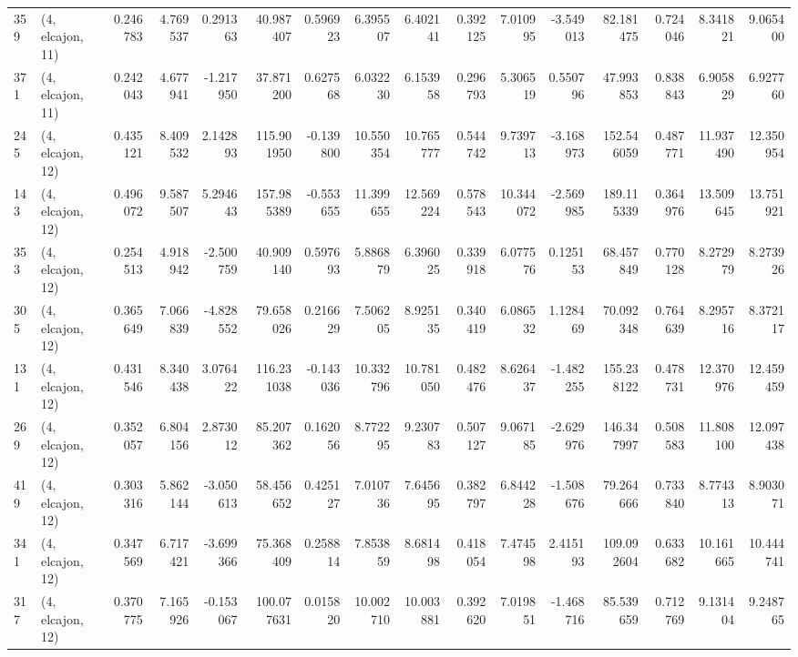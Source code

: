 \begin{tabular}{llrrrrrrrrrrrrrr}
359 &  (4, elcajon, 11) &   0.246783 &   4.769537 &   0.291363 &    40.987407 &   0.596923 &   6.395507 &   6.402141 &  0.392125 &   7.010995 &  -3.549013 &    82.181475 &   0.724046 &   8.341821 &   9.065400 \\
371 &  (4, elcajon, 11) &   0.242043 &   4.677941 &  -1.217950 &    37.871200 &   0.627568 &   6.032230 &   6.153958 &  0.296793 &   5.306519 &   0.550796 &    47.993853 &   0.838843 &   6.905829 &   6.927760 \\
245 &  (4, elcajon, 12) &   0.435121 &   8.409532 &   2.142893 &   115.901950 &  -0.139800 &  10.550354 &  10.765777 &  0.544742 &   9.739713 &  -3.168973 &   152.546059 &   0.487771 &  11.937490 &  12.350954 \\
143 &  (4, elcajon, 12) &   0.496072 &   9.587507 &   5.294643 &   157.985389 &  -0.553655 &  11.399655 &  12.569224 &  0.578543 &  10.344072 &  -2.569985 &   189.115339 &   0.364976 &  13.509645 &  13.751921 \\
353 &  (4, elcajon, 12) &   0.254513 &   4.918942 &  -2.500759 &    40.909140 &   0.597693 &   5.886879 &   6.396025 &  0.339918 &   6.077576 &   0.125153 &    68.457849 &   0.770128 &   8.272979 &   8.273926 \\
305 &  (4, elcajon, 12) &   0.365649 &   7.066839 &  -4.828552 &    79.658026 &   0.216629 &   7.506205 &   8.925135 &  0.340419 &   6.086532 &   1.128469 &    70.092348 &   0.764639 &   8.295716 &   8.372117 \\
131 &  (4, elcajon, 12) &   0.431546 &   8.340438 &   3.076422 &   116.231038 &  -0.143036 &  10.332796 &  10.781050 &  0.482476 &   8.626437 &  -1.482255 &   155.238122 &   0.478731 &  12.370976 &  12.459459 \\
269 &  (4, elcajon, 12) &   0.352057 &   6.804156 &   2.873012 &    85.207362 &   0.162056 &   8.772295 &   9.230783 &  0.507127 &   9.067185 &  -2.629976 &   146.347997 &   0.508583 &  11.808100 &  12.097438 \\
419 &  (4, elcajon, 12) &   0.303316 &   5.862144 &  -3.050613 &    58.456652 &   0.425127 &   7.010736 &   7.645695 &  0.382797 &   6.844228 &  -1.508676 &    79.264666 &   0.733840 &   8.774313 &   8.903071 \\
341 &  (4, elcajon, 12) &   0.347569 &   6.717421 &  -3.699366 &    75.368409 &   0.258814 &   7.853859 &   8.681498 &  0.418054 &   7.474598 &   2.415193 &   109.092604 &   0.633682 &  10.161665 &  10.444741 \\
317 &  (4, elcajon, 12) &   0.370775 &   7.165926 &  -0.153067 &   100.077631 &   0.015820 &  10.002710 &  10.003881 &  0.392620 &   7.019851 &  -1.468716 &    85.539659 &   0.712769 &   9.131404 &   9.248765 \\

\end{tabular}
